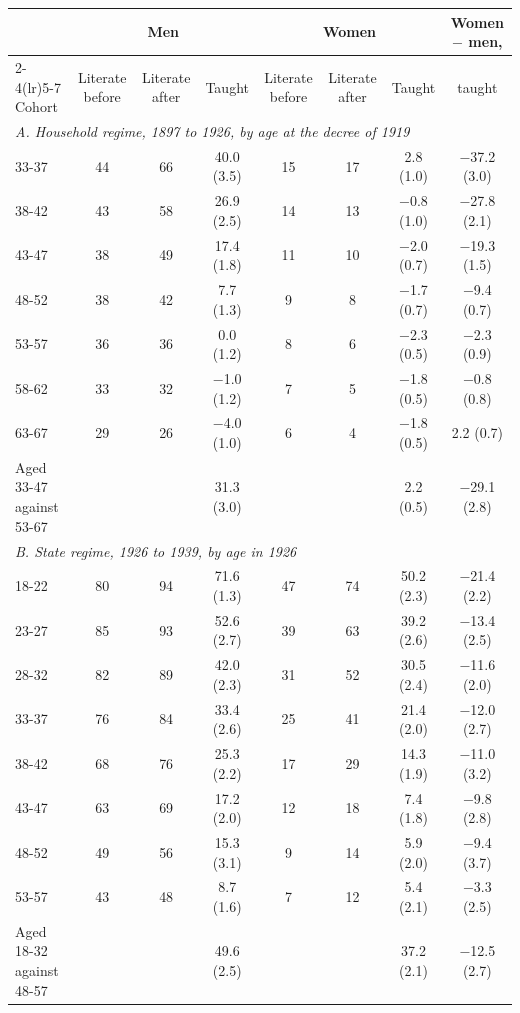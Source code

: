 \begin{tabular}{lccccccc}
\toprule
 & \multicolumn{3}{c}{Men} & \multicolumn{3}{c}{Women} & Women $-$ men, \\
\cmidrule(lr){2-4}\cmidrule(lr){5-7}
Cohort & Literate before & Literate after & Taught & Literate before & Literate after & Taught & taught \\
\midrule
\multicolumn{8}{l}{\textit{A. Household regime, 1897 to 1926, by age at the decree of 1919}} \\
33-37 & 44 & 66 & 40.0 (3.5) & 15 & 17 & 2.8 (1.0) & $-$37.2 (3.0) \\
38-42 & 43 & 58 & 26.9 (2.5) & 14 & 13 & $-$0.8 (1.0) & $-$27.8 (2.1) \\
43-47 & 38 & 49 & 17.4 (1.8) & 11 & 10 & $-$2.0 (0.7) & $-$19.3 (1.5) \\
48-52 & 38 & 42 & 7.7 (1.3) & 9 & 8 & $-$1.7 (0.7) & $-$9.4 (0.7) \\
53-57 & 36 & 36 & 0.0 (1.2) & 8 & 6 & $-$2.3 (0.5) & $-$2.3 (0.9) \\
58-62 & 33 & 32 & $-$1.0 (1.2) & 7 & 5 & $-$1.8 (0.5) & $-$0.8 (0.8) \\
63-67 & 29 & 26 & $-$4.0 (1.0) & 6 & 4 & $-$1.8 (0.5) & 2.2 (0.7) \\
Aged 33-47 against 53-67 & & & 31.3 (3.0) & & & 2.2 (0.5) & $-$29.1 (2.8) \\
\midrule
\multicolumn{8}{l}{\textit{B. State regime, 1926 to 1939, by age in 1926}} \\
18-22 & 80 & 94 & 71.6 (1.3) & 47 & 74 & 50.2 (2.3) & $-$21.4 (2.2) \\
23-27 & 85 & 93 & 52.6 (2.7) & 39 & 63 & 39.2 (2.6) & $-$13.4 (2.5) \\
28-32 & 82 & 89 & 42.0 (2.3) & 31 & 52 & 30.5 (2.4) & $-$11.6 (2.0) \\
33-37 & 76 & 84 & 33.4 (2.6) & 25 & 41 & 21.4 (2.0) & $-$12.0 (2.7) \\
38-42 & 68 & 76 & 25.3 (2.2) & 17 & 29 & 14.3 (1.9) & $-$11.0 (3.2) \\
43-47 & 63 & 69 & 17.2 (2.0) & 12 & 18 & 7.4 (1.8) & $-$9.8 (2.8) \\
48-52 & 49 & 56 & 15.3 (3.1) & 9 & 14 & 5.9 (2.0) & $-$9.4 (3.7) \\
53-57 & 43 & 48 & 8.7 (1.6) & 7 & 12 & 5.4 (2.1) & $-$3.3 (2.5) \\
Aged 18-32 against 48-57 & & & 49.6 (2.5) & & & 37.2 (2.1) & $-$12.5 (2.7) \\
\bottomrule
\end{tabular}
